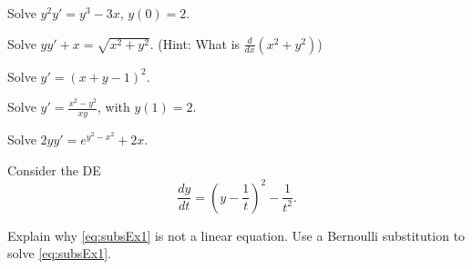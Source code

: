 \documentclass{ximera}
\begin{document}
\begin{exercise}%
    Solve $y^2y' = y^3-3x$, $y(0)=2$.
\end{exercise}

\begin{exercise}
    Solve $yy' + x = \sqrt{x^2 + y^2}$. (Hint: What is $\frac{d}{dx}(x^2 + y^2)$)
\end{exercise}

\begin{exercise}
    Solve $y' = {(x+y-1)}^2$.
\end{exercise}

\begin{exercise}
    Solve $y' = \frac{x^2-y^2}{x y}$, with $y(1) = 2$.
\end{exercise}

\begin{exercise}
    Solve $2yy' = e^{y^2-x^2} + 2x$.
\end{exercise}

\begin{exercise}
    Consider the  DE 
    \begin{equation}
        \frac{dy}{dt}=\left( y -\frac{1}{t} \right)^2 - \frac{1}{t^2}. \label{eq:subsEx1}
    \end{equation} %
    \begin{tasks}
        \task Explain why \eqref{eq:subsEx1} is not a linear equation.
        \task Use a Bernoulli substitution to solve \eqref{eq:subsEx1}.
    \end{tasks}
\end{exercise}

\end{document}

